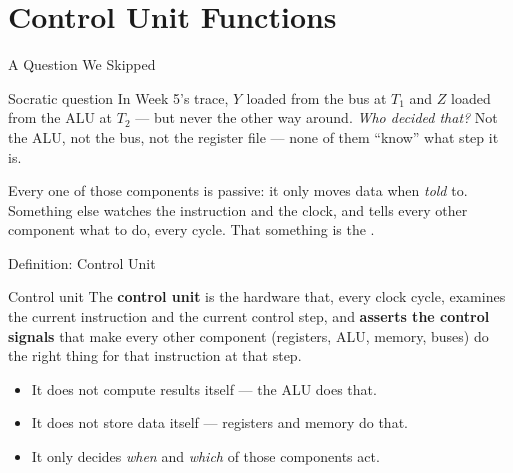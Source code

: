 \documentclass[aspectratio=169]{beamer}
\begin{document}

\section{Control Unit Functions}

\begin{frame}{A Question We Skipped}
  \begin{block}{Socratic question}
    In Week 5's trace, $Y_{}$ loaded from the bus at $T_1$ and $Z$ loaded from the
    ALU at $T_2$ --- but never the other way around. \emph{Who decided that?} Not
    the ALU, not the bus, not the register file --- none of them ``know'' what
    step it is.
  \end{block}
  Every one of those components is passive: it only moves data when \emph{told}
  to. Something else watches the instruction and the clock, and tells every other
  component what to do, every cycle. That something is the .
\end{frame}

\begin{frame}{Definition: Control Unit}
  \begin{block}{Control unit}
    The \textbf{control unit} is the hardware that, every clock cycle, examines
    the current instruction and the current control step, and \textbf{asserts the
    control signals} that make every other component (registers, ALU, memory,
    buses) do the right thing for that instruction at that step.
  \end{block}
  \begin{itemize}
    \item It does not compute results itself --- the ALU does that.
    \item It does not store data itself --- registers and memory do that.
    \item It only decides \emph{when} and \emph{which} of those components act.
  \end{itemize}
\end{frame}
\end{document}
